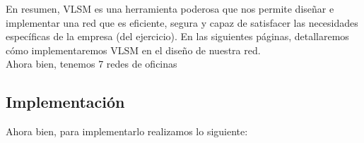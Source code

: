 En resumen, VLSM es una herramienta poderosa que nos permite diseñar e
implementar una red que es eficiente, segura y capaz de satisfacer las
necesidades específicas de la empresa (del ejercicio). En las siguientes
páginas, detallaremos cómo implementaremos VLSM en el diseño de nuestra red.
\\

Ahora bien, tenemos 7 redes de oficinas

\subsection{Implementación}

Ahora bien, para implementarlo realizamos lo siguiente:
